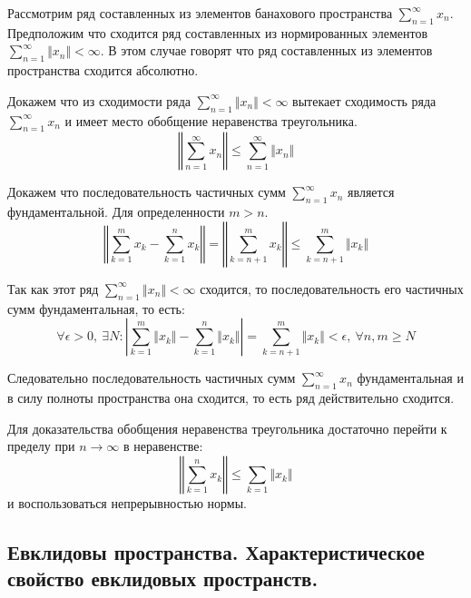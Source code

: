 \documentclass[14pt,a4paper]{extarticle}
\theoremstyle{definition}
\theoremstyle{remark}
\renewcommand{\[}{\begin{dmath*}[compact]}
\renewcommand{\]}{\end{dmath*}}
\newcommand{\ds}{\displaystyle}
\newcommand{\sep}{ , \ \allowbreak }
\begin{document}
Рассмотрим ряд составленных из элементов банахового пространства
$\ds\sum_{n=1}^\infty x_n$.
Предположим что сходится ряд составленных из нормированных элементов
$\ds\sum_{n=1}^\infty \Vert x_n \Vert < \infty$.
В этом случае говорят что ряд составленных из элементов пространства
сходится абсолютно.

Докажем что из сходимости ряда $\ds\sum_{n=1}^\infty \Vert x_n \Vert < \infty$
вытекает сходимость ряда $\ds\sum_{n=1}^\infty x_n$ и имеет место обобщение
неравенства треугольника.
\[\left \Vert \sum_{n=1}^\infty x_n \right \Vert \leq
\sum_{n=1}^\infty \Vert x_n \Vert\]

Докажем что последовательность частичных сумм $\ds\sum_{n=1}^\infty x_n$
является фундаментальной.
Для определенности $m>n$.
\[{\left \Vert \sum_{k=1}^m x_k - \sum_{k=1}^n x_k \right \Vert} \allowbreak
= {\left \Vert \sum_{k=n+1}^m x_k \right \Vert} \allowbreak
\leq {\sum_{k=n+1}^m \Vert x_k \Vert}\]

Так как этот ряд $\ds\sum_{n=1}^\infty \Vert x_n \Vert < \infty$ сходится,
то последовательность его частичных сумм фундаментальная, то есть:
\[ {\forall \epsilon > 0} \sep \exists N:
{\left| \sum_{k=1}^m \Vert x_k \Vert - \sum_{k=1}^n \Vert x_k \Vert \right|}
\allowbreak = {\sum_{k=n+1}^m \Vert x_k \Vert < \epsilon}
\sep {\forall n,m \geq N} \]

Следовательно последовательность частичных сумм $\sum_{n=1}^\infty x_n$
фундаментальная и в силу полноты пространства она сходится,
то есть ряд действительно сходится.

Для доказательства обобщения неравенства треугольника достаточно перейти к
пределу при $n \to \infty$ в неравенстве:
\[ \left \Vert \sum_{k=1}^n x_k \right \Vert \leq \sum_{k=1} \Vert x_k \Vert \]
и воспользоваться непрерывностью нормы.

\subsection{Евклидовы пространства.
Характеристическое свойство евклидовых пространств.}
\end{document}
